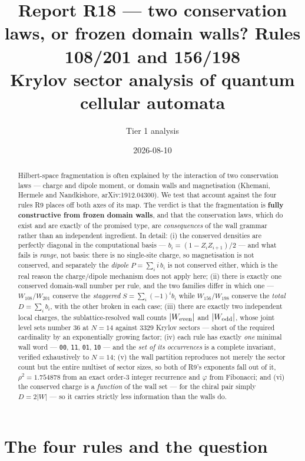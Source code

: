 \documentclass[11pt]{article}
\title{\textbf{Report R18 --- two conservation laws, or frozen domain walls?
Rules 108/201 and 156/198}\\
\large Krylov sector analysis of quantum cellular automata}
\author{Tier 1 analysis}
\date{2026-08-10}
\newcommand{\rt}[1]{\texttt{#1}}
\theoremstyle{plain}
\begin{document}
\maketitle

\begin{abstract}
Hilbert-space fragmentation is often explained by the interaction of two
conservation laws --- charge and dipole moment, or domain walls and
magnetisation (Khemani, Hermele and Nandkishore, arXiv:1912.04300). We test that
account against the four rules R9 places off both axes of its map. The verdict is
that the fragmentation is \textbf{fully constructive from frozen domain walls},
and that the conservation laws, which do exist and are exactly of the promised
type, are \emph{consequences} of the wall grammar rather than an independent
ingredient. In detail: (i) the conserved densities are perfectly diagonal in the
computational basis --- $b_i = (1-Z_iZ_{i+1})/2$ --- and what fails is
\emph{range}, not basis: there is no single-site charge, so magnetisation is not
conserved, and separately the \emph{dipole} $P=\sum_i i\,b_i$ is not conserved
either, which is the real reason the charge/dipole mechanism does not apply here;
(ii) there is exactly one conserved domain-wall number per rule, and the two
families differ in which one --- $W_{108}/W_{201}$ conserve the \emph{staggered}
$S=\sum_i(-1)^i b_i$ while $W_{156}/W_{198}$ conserve the \emph{total}
$D=\sum_i b_i$, with the other broken in each case;
(iii) there are exactly two independent local charges, the sublattice-resolved
wall counts $|W_{\rm even}|$ and $|W_{\rm odd}|$, whose joint level sets number
$36$ at $N=14$ against $3329$ Krylov sectors --- short of the required
cardinality by an exponentially growing factor; (iv) each rule has exactly
\emph{one} minimal wall word ---
\rt{00}, \rt{11}, \rt{01}, \rt{10} --- and the \emph{set of its occurrences} is a
complete invariant, verified exhaustively to $N=14$; (v) the wall partition
reproduces not merely the sector count but the entire multiset of sector sizes,
so both of R9's exponents fall out of it, $\rho^2=1.754878$ from an exact
order-3 integer recurrence and $\varphi$ from Fibonacci; and (vi) the conserved
charge is a \emph{function} of the wall set --- for the chiral pair simply
$D=2|W|$ --- so it carries strictly less information than the walls do.
\end{abstract}

\tableofcontents

\section{The four rules and the question}
\end{document}
